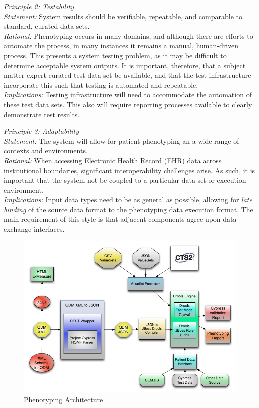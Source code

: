\documentclass{amia}
\begin{document}
\textit{Principle 2: Testability}\\
\textit{Statement:} System results should be verifiable, repeatable, and comparable to standard, curated data sets.\\
\textit{Rational:} Phenotyping occurs in many domains, and although there are efforts to automate the process\cite{chung2008automated,kyzar2011towards}, in many instances it remains a manual, human-driven process\cite{tao2013phenotyping}. This presents a system testing problem, as it may be difficult to determine acceptable system outputs. It is important, therefore, that a subject matter expert curated test data set be available, and that the test infrastructure incorporate this such that testing is automated and repeatable.\\
\textit{Implications:} Testing infrastructure will need to accommodate the automation of these test data sets. This also will require reporting processes available to clearly demonstrate test results.

\textit{Principle 3: Adaptability}\\
\textit{Statement:} The system will allow for patient phenotyping an a wide range of contexts and environments.\\
\textit{Rational:} When accessing Electronic Health Record (EHR) data across institutional boundaries, significant interoperability challenges arise\cite{chute2011sharpn}. As such, it is important that the system not be coupled to a particular data set or execution environment.\\
\textit{Implications:} Input data types need to be as general as possible, allowing for \textit{late binding} of the source data format to the phenotyping data execution format. The main requirement of this style is that adjacent components agree upon data exchange interfaces. 

\begin{figure}
\includegraphics[width=\textwidth]{htp-drools-arch}
\caption{Phenotyping Architecture} 
\label{fig:overall_arch}
\end{figure}
\end{document}
